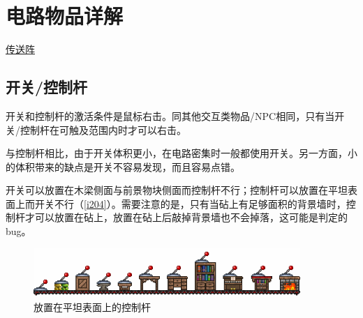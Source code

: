\chapter{电路物品详解}\label{sec1}

\begin{introduction}
\item {}
\item \hyperref[chuansongji]{传送阵}
\item {}
\end{introduction}

\section{开关/控制杆}
\begin{figure}[!ht]
\centering
{}
\qquad
{}
\caption{}
\end{figure}

开关和控制杆的激活条件是鼠标右击。同其他交互类物品/NPC相同，只有当开关/控制杆在可触及范围内时才可以右击。

与控制杆相比，由于开关体积更小，在电路密集时一般都使用开关。另一方面，小的体积带来的缺点是开关不容易发现，而且容易点错。

开关可以放置在木梁侧面与前景物块侧面而控制杆不行；控制杆可以放置在平坦表面上而开关不行（\autoref{i204}）。需要注意的是，只有当砧上有足够面积的背景墙时，控制杆才可以放置在砧上，放置在砧上后敲掉背景墙也不会掉落，这可能是判定的bug。

\begin{figure}[!ht]
\centering
\includegraphics[width=0.9\textwidth]{images/204.png}
\caption{放置在平坦表面上的控制杆}
\label{i204}
\end{figure}

